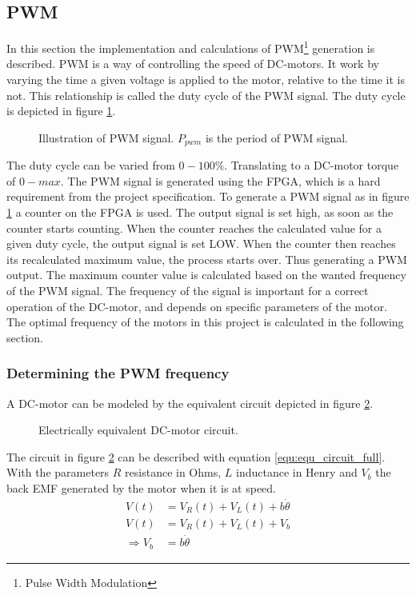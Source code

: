 \documentclass[../../../Main]{subfiles}
\begin{document}
\subsection{PWM}
In this section the implementation and calculations of PWM\footnote{Pulse Width Modulation} generation is described. PWM is a way of controlling the speed of DC-motors. It work by varying the time a given voltage is applied to the motor, relative to the time it is not. This relationship is called the duty cycle of the PWM signal. The duty cycle is depicted in figure \ref{fig:pwm}.

\begin{figure}[h]
  
  \caption{Illustration of PWM signal. $P_{pwm}$ is the period of PWM signal.}
  \label{fig:pwm}
\end{figure}

The duty cycle can be varied from $0 - 100\%$. Translating to a DC-motor torque of $0 - max$.
The PWM signal is generated using the FPGA, which is a hard requirement from the project  specification. To generate a PWM signal as in figure \ref{fig:pwm} a counter on the FPGA  is used.
The output signal is set high, as soon as the counter starts counting. When the counter reaches the calculated value for a given duty cycle, the output signal is set LOW. When the counter then reaches its recalculated maximum value, the process starts over. Thus generating a PWM output. The maximum counter value is calculated based on the wanted frequency of the PWM signal. The frequency of the signal is important for a correct operation of the DC-motor, and depends on specific parameters of the motor. The optimal frequency of the motors in this project is calculated in the following section.
\newpage
\subsubsection{Determining the PWM frequency}

A DC-motor can be modeled by the equivalent circuit depicted in figure \ref{fig:electrical_equ}.

\begin{figure}[ht]
	\center
    \def\svgwidth{0.5\textwidth}
	
	\caption{Electrically equivalent DC-motor circuit.}
  \label{fig:electrical_equ}
\end{figure}
The circuit in figure \ref{fig:electrical_equ} can be described with equation \ref{equ:equ_circuit_full}. With the parameters $R$ resistance in Ohms, $L$ inductance in Henry and $V_b$ the back EMF generated by the motor when it is at speed.
\begin{align}
	V(t) &= V_R(t) + V_L(t) + b\dot{\theta}\\
 \label{equ:equ_circuit_full}
	V(t) &= V_R(t) + V_L(t) + V_b\\
	\Rightarrow V_b &= b\dot{\theta}
\end{align}
\end{document}

